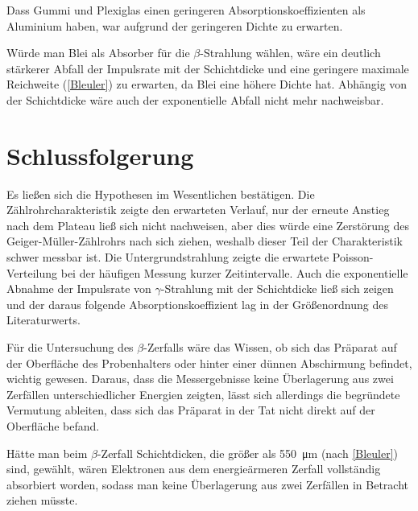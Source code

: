 \documentclass[
	a4paper,
	12pt,
	pagesize,
	ngerman
]{scrartcl}
\begin{document}
	\subsubsection*{}
	Dass Gummi und Plexiglas einen geringeren Absorptionskoeffizienten als Aluminium haben, war aufgrund der geringeren Dichte zu erwarten.
	\par
	Würde man Blei als Absorber für die $\beta$-Strahlung wählen, wäre ein deutlich stärkerer Abfall der Impulsrate mit der Schichtdicke und eine geringere maximale Reichweite (\cref{Bleuler}) zu erwarten, da Blei eine höhere Dichte hat.
	Abhängig von der Schichtdicke wäre auch der exponentielle Abfall nicht mehr nachweisbar.
	
	\section{Schlussfolgerung}
	Es ließen sich die Hypothesen im Wesentlichen bestätigen.
	Die Zählrohrcharakteristik zeigte den erwarteten Verlauf, nur der erneute Anstieg nach dem Plateau ließ sich nicht nachweisen, aber dies würde eine Zerstörung des Geiger-Müller-Zählrohrs nach sich ziehen, weshalb dieser Teil der Charakteristik schwer messbar ist.
	Die Untergrundstrahlung zeigte die erwartete Poisson-Verteilung bei der häufigen Messung kurzer Zeitintervalle.
	Auch die exponentielle Abnahme der Impulsrate von $\gamma$-Strahlung mit der Schichtdicke ließ sich zeigen und der daraus folgende Absorptionskoeffizient lag in der Größenordnung des Literaturwerts.
	
	Für die Untersuchung des $\beta$-Zerfalls wäre das Wissen, ob sich das Präparat auf der Oberfläche des Probenhalters oder hinter einer dünnen Abschirmung befindet, wichtig gewesen.
	Daraus, dass die Messergebnisse keine Überlagerung aus zwei Zerfällen unterschiedlicher Energien zeigten, lässt sich allerdings die begründete Vermutung ableiten, dass sich das Präparat in der Tat nicht direkt auf der Oberfläche befand.
	
	Hätte man beim $\beta$-Zerfall Schichtdicken, die größer als \SI{550}{\micro \meter} (nach \cref{Bleuler}) sind, gewählt, wären Elektronen aus dem energieärmeren Zerfall vollständig absorbiert worden, sodass man keine Überlagerung aus zwei Zerfällen in Betracht ziehen müsste.
	\printbibliography
\end{document}
